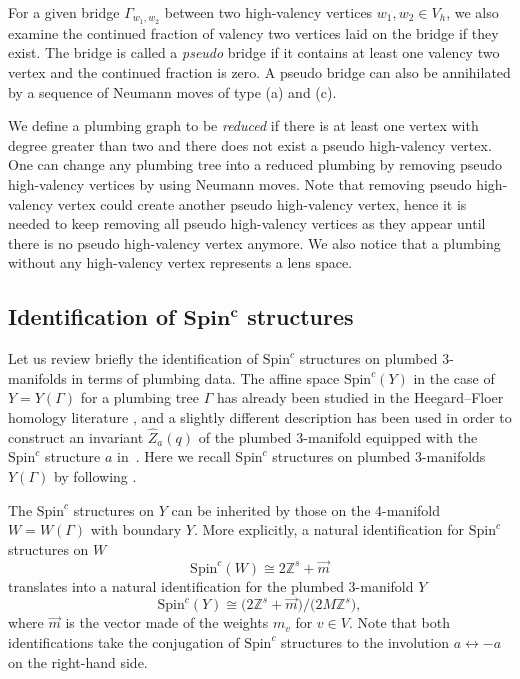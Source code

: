 \documentclass[11pt]{article}
\numberwithin{equation}{section}
\numberwithin{equation}{section}
\begin{document}
For a given bridge $ \Gamma_{w_1,w_2} $ between two high-valency vertices $ w_1,w_2\in V_h $, we also examine the continued fraction of valency two vertices laid on the bridge if they exist. The bridge is called a \textit{pseudo} bridge if it contains at least one valency two vertex and the continued fraction is zero. A pseudo bridge can also be annihilated by a sequence of Neumann moves of type (a) and (c).

We define a plumbing graph to be \textit{reduced} if there is at least one vertex with degree greater than two and there does not exist a pseudo high-valency vertex. One can change any plumbing tree into a reduced plumbing by removing pseudo high-valency vertices by using Neumann moves. Note that removing pseudo high-valency vertex could create another pseudo high-valency vertex, hence it is needed to keep removing all pseudo high-valency vertices as they appear until there is no pseudo high-valency vertex anymore. We also notice that a plumbing without any high-valency vertex represents a lens space.

\subsection[Identification of Spin\^{}c structures]{Identification of $\boldsymbol{\text{Spin}^c}$ structures}

Let us review briefly the identification of $ \text{Spin}^c $ structures on plumbed 3-manifolds in terms of plumbing data. The affine space $ \text{Spin}^c(Y) $ in the case of $ Y=Y(\Gamma) $ for a plumbing tree $ \Gamma $ has already been studied in the Heegard--Floer homology literature \cite{heegard-floer}, and a slightly different description has been used in order to construct an invariant $ \hat{Z}_a(q) $ of the plumbed 3-manifold equipped with the $\text{Spin}^c$ structure $ a $ in~\cite{gukov}. Here we recall $ \text{Spin}^c $ structures on plumbed 3-mani\-folds $ Y(\Gamma) $ by following \cite{gukov}.

The $ \text{Spin}^c $ structures on $ Y $ can be inherited by those on the 4-manifold $ W=W(\Gamma) $ with boundary $ Y $. More explicitly, a natural identification for $ \text{Spin}^c $ structures on $ W $
\begin{equation*}
	\text{Spin}^c(W)\cong 2\mathbb{Z}^s+\vec{m}
\end{equation*}
translates into a natural identification for the plumbed 3-manifold $ Y $
\begin{equation*}
	\text{Spin}^c(Y)\cong \big(2\mathbb{Z}^s+\vec{m}\big)/\big(2M\mathbb{Z}^s\big),
\end{equation*}
where $ \vec{m} $ is the vector made of the weights $ m_v $ for $ v\in V $. Note that both identifications take the conjugation of $ \text{Spin}^c $ structures to the involution $ a\leftrightarrow -a $ on the right-hand side.
\end{document}
